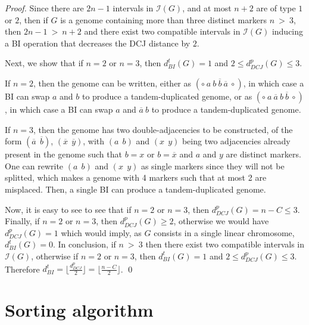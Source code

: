 \documentclass{llncs}
\newcommand{\fst}[1]{ \ensuremath{#1} }
\newcommand{\snd}[1]{ \ensuremath{\overline{#1}} }
\newcommand\aff[2]{\ensuremath{(\fst{#1}~~\fst{#2})}}
\newcommand\ass[2]{\ensuremath{(\snd{#1}~~\snd{#2})}}
\begin{document}
\begin{proof}




    Since there are $2n - 1$ intervals in $\mathcal{I}(G)$, and at
    most $n+2$ are of type $1$ or $2$, then if $G$ is a genome
    containing more than three distinct markers $n~>~3$, then
    $2n-1~>~n+2$ and there exist two compatible intervals in
    $\mathcal{I}(G)$ inducing a BI operation that decreases the DCJ
    distance by $2$.







Next, we show that if $n = 2$ or $n = 3$, then $d^t_{BI}(G)=1$ and $2
\leq d^p_{DCJ}(G) \leq 3$.
 
If $n = 2$, then the genome can be written, either as
$(\circ~\fst{a}~\fst{b}~\snd{b}~\snd{a}~ \circ)$, in which case a BI
can swap $\fst{a}$ and $\fst{b}$ to produce a tandem-duplicated
genome, or as $(\circ~\fst{a}~\snd{a}~\fst{b}~\snd{b}~\circ)$, in
which case a BI can swap $a$ and $\snd{a}~\fst{b}$ to produce a
tandem-duplicated genome.

If $n = 3$, then the genome has two double-adjacencies to be
constructed, of the form $\ass{a}{b}$, $\ass{x}{y}$, with $\aff{a}{b}$
and $\aff{x}{y}$ being two adjacencies already present in the genome
such that $\fst{b} = \fst{x}$ or $\fst{b} = \snd{x}$ and $a$ and $y$
are distinct markers. One can rewrite $\aff{a}{b}$ and $\aff{x}{y}$ as
single markers since they will not be splitted, which makes a genome
with 4 markers such that at most 2 are misplaced. Then, a single BI
can produce a tandem-duplicated genome.

Now, it is easy to see to see that if  $n = 2$ or $n = 3$, then $d^p_{DCJ}(G) = n- C \leq 3$. Finally, if  $n = 2$ or $n = 3$, then $d^p_{DCJ}(G) \geq 2$, otherwise we would have  $d^p_{DCJ}(G) = 1$ which would imply, as $G$ consists in a single linear chromosome, $d^t_{BI}(G) = 0$.
In conclusion, if $n~>~3$ then there exist two compatible intervals in  $\mathcal{I}(G)$, otherwise if  $n = 2$ or $n = 3$, then $d^t_{BI}(G)=1$ and  $2 \leq d^p_{DCJ}(G) \leq 3$. Therefore $d^t_{BI} = \lfloor \frac{d^p_{DCJ}}{2}\rfloor = \lfloor \frac{n-C}{2}\rfloor$. \qed


\end{proof}





\section{Sorting algorithm}
\label{sec:scenario}
\end{document}
